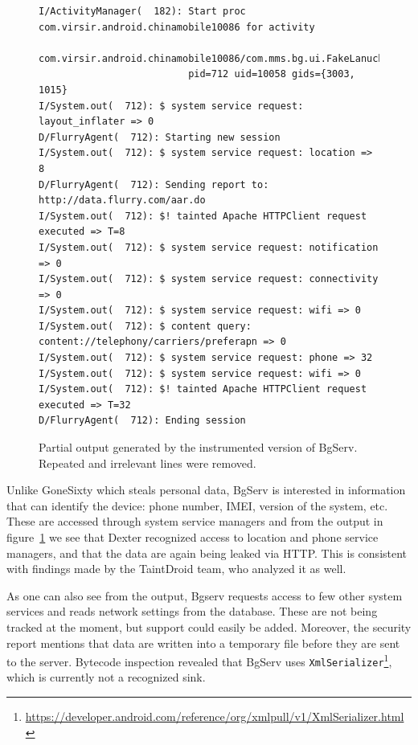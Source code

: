\documentclass[12pt,twoside,notitlepage]{report}
\begin{document}
\begin{figure}[t]
	\scriptsize
	\begin{verbatim}
I/ActivityManager(  182): Start proc com.virsir.android.chinamobile10086 for activity 
                          com.virsir.android.chinamobile10086/com.mms.bg.ui.FakeLanucherActivity: 
                          pid=712 uid=10058 gids={3003, 1015}
I/System.out(  712): $ system service request: layout_inflater => 0
D/FlurryAgent(  712): Starting new session
I/System.out(  712): $ system service request: location => 8
D/FlurryAgent(  712): Sending report to: http://data.flurry.com/aar.do
I/System.out(  712): $! tainted Apache HTTPClient request executed => T=8
I/System.out(  712): $ system service request: notification => 0
I/System.out(  712): $ system service request: connectivity => 0
I/System.out(  712): $ system service request: wifi => 0
I/System.out(  712): $ content query: content://telephony/carriers/preferapn => 0
I/System.out(  712): $ system service request: phone => 32
I/System.out(  712): $ system service request: wifi => 0
I/System.out(  712): $! tainted Apache HTTPClient request executed => T=32
D/FlurryAgent(  712): Ending session
	\end{verbatim}
	\caption{Partial output generated by the instrumented version of BgServ. Repeated and irrelevant lines were removed.}
	\label{figure:Evaluation_BgServ}
\end{figure}

Unlike GoneSixty which steals personal data, BgServ is interested in information that can identify the device: phone number, IMEI, version of the system, etc. These are accessed through system service managers and from the output in figure~\ref{figure:Evaluation_BgServ} we see that Dexter recognized access to location and phone service managers, and that the data are again being leaked via HTTP. This is consistent with findings made by the TaintDroid team, who analyzed it as well.

As one can also see from the output, Bgserv requests access to few other system services and reads network settings from the database. These are not being tracked at the moment, but support could easily be added. Moreover, the security report mentions that data are written into a temporary file before they are sent to the server. Bytecode inspection revealed that BgServ uses \verb$XmlSerializer$\footnote{\scriptsize\url{https://developer.android.com/reference/org/xmlpull/v1/XmlSerializer.html}}, which is currently not a recognized sink.
\end{document}
